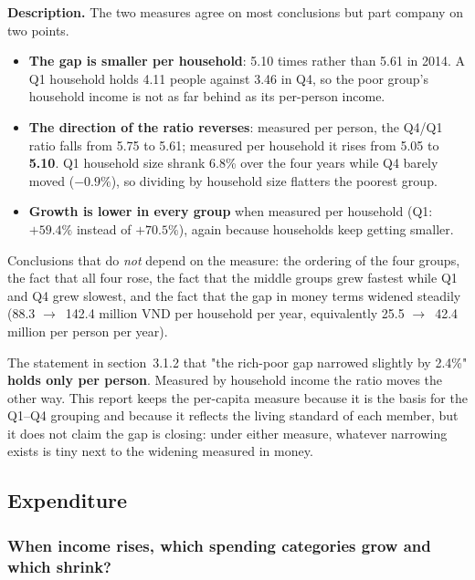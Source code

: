 \documentclass[11pt,a4paper]{article}
\newcommand{\ra}{$\rightarrow$}
\newcommand{\n}[1]{\textbf{#1}}
\begin{document}
\textbf{Description.} The two measures agree on most conclusions but part company on two points.

\begin{itemize}[leftmargin=1.3em,itemsep=3pt,topsep=2pt]
\item \n{The gap is smaller per household}: 5.10 times rather than 5.61 in 2014. A Q1 household holds 4.11 people against 3.46 in Q4, so the poor group's household income is not as far behind as its per-person income.
\item \n{The direction of the ratio reverses}: measured per person, the Q4/Q1 ratio falls from 5.75 to 5.61; measured per household it rises from 5.05 to \n{5.10}. Q1 household size shrank 6.8\% over the four years while Q4 barely moved ($-0.9\%$), so dividing by household size flatters the poorest group.
\item \n{Growth is lower in every group} when measured per household (Q1: $+59.4\%$ instead of $+70.5\%$), again because households keep getting smaller.
\end{itemize}

Conclusions that do \emph{not} depend on the measure: the ordering of the four groups, the fact that all four rose, the fact that the middle groups grew fastest while Q1 and Q4 grew slowest, and the fact that the gap in money terms widened steadily (88.3 \ra\ 142.4 million VND per household per year, equivalently 25.5 \ra\ 42.4 million per person per year).

\begin{luuy}
The statement in section~3.1.2 that "the rich-poor gap narrowed slightly by 2.4\%" \n{holds only per person}. Measured by household income the ratio moves the other way. This report keeps the per-capita measure because it is the basis for the Q1--Q4 grouping and because it reflects the living standard of each member, but it does not claim the gap is closing: under either measure, whatever narrowing exists is tiny next to the widening measured in money.
\end{luuy}

\subsection{Expenditure}

\subsubsection{When income rises, which spending categories grow and which shrink?}
\end{document}
